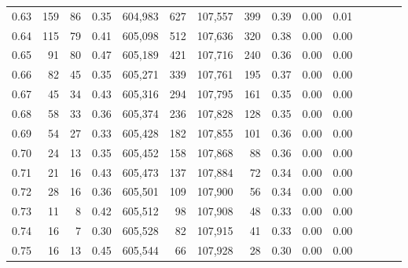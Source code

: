\begin{tabular}{rrrcrrrrrrrrrrr}
0.63 &     159 &     86 &                                       0.35 &  604,983 &      627 &  107,557 &      399 &  0.39 &  0.00 &                         0.01 \\
0.64 &     115 &     79 &                                       0.41 &  605,098 &      512 &  107,636 &      320 &  0.38 &  0.00 &                         0.00 \\
0.65 &      91 &     80 &                                       0.47 &  605,189 &      421 &  107,716 &      240 &  0.36 &  0.00 &                         0.00 \\
0.66 &      82 &     45 &                                       0.35 &  605,271 &      339 &  107,761 &      195 &  0.37 &  0.00 &                         0.00 \\
0.67 &      45 &     34 &                                       0.43 &  605,316 &      294 &  107,795 &      161 &  0.35 &  0.00 &                         0.00 \\
0.68 &      58 &     33 &                                       0.36 &  605,374 &      236 &  107,828 &      128 &  0.35 &  0.00 &                         0.00 \\
0.69 &      54 &     27 &                                       0.33 &  605,428 &      182 &  107,855 &      101 &  0.36 &  0.00 &                         0.00 \\
0.70 &      24 &     13 &                                       0.35 &  605,452 &      158 &  107,868 &       88 &  0.36 &  0.00 &                         0.00 \\
0.71 &      21 &     16 &                                       0.43 &  605,473 &      137 &  107,884 &       72 &  0.34 &  0.00 &                         0.00 \\
0.72 &      28 &     16 &                                       0.36 &  605,501 &      109 &  107,900 &       56 &  0.34 &  0.00 &                         0.00 \\
0.73 &      11 &      8 &                                       0.42 &  605,512 &       98 &  107,908 &       48 &  0.33 &  0.00 &                         0.00 \\
0.74 &      16 &      7 &                                       0.30 &  605,528 &       82 &  107,915 &       41 &  0.33 &  0.00 &                         0.00 \\
0.75 &      16 &     13 &                                       0.45 &  605,544 &       66 &  107,928 &       28 &  0.30 &  0.00 &                         0.00 \\

\end{tabular}
